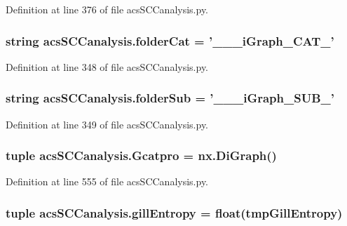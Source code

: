 Definition at line 376 of file acs\-S\-C\-Canalysis.\-py.

\hypertarget{a00096_a1cbfd083273176eebfe0260e8384acef}{
\subsubsection[{folder\-Cat}]{\setlength{\rightskip}{0pt plus 5cm}string acs\-S\-C\-Canalysis.\-folder\-Cat = '\-\_\-\-\_\-\_\-i\-Graph\-\_\-\-C\-A\-T\-\_\-'}}\label{a00096_a1cbfd083273176eebfe0260e8384acef}


Definition at line 348 of file acs\-S\-C\-Canalysis.\-py.

\hypertarget{a00096_a90c2bcabbdb271c2c3347ebea4c259bc}{
\subsubsection[{folder\-Sub}]{\setlength{\rightskip}{0pt plus 5cm}string acs\-S\-C\-Canalysis.\-folder\-Sub = '\-\_\-\-\_\-\_\-i\-Graph\-\_\-\-S\-U\-B\-\_\-'}}\label{a00096_a90c2bcabbdb271c2c3347ebea4c259bc}


Definition at line 349 of file acs\-S\-C\-Canalysis.\-py.

\hypertarget{a00096_ad88c3dd8eb89ddbe8720462b03f35003}{
\subsubsection[{Gcatpro}]{\setlength{\rightskip}{0pt plus 5cm}tuple acs\-S\-C\-Canalysis.\-Gcatpro = nx.\-Di\-Graph()}}\label{a00096_ad88c3dd8eb89ddbe8720462b03f35003}


Definition at line 555 of file acs\-S\-C\-Canalysis.\-py.

\hypertarget{a00096_a4c214eb4f6812d6182bae32715bce3ad}{
\subsubsection[{gill\-Entropy}]{\setlength{\rightskip}{0pt plus 5cm}tuple acs\-S\-C\-Canalysis.\-gill\-Entropy = float(tmp\-Gill\-Entropy)}}\label{a00096_a4c214eb4f6812d6182bae32715bce3ad}


